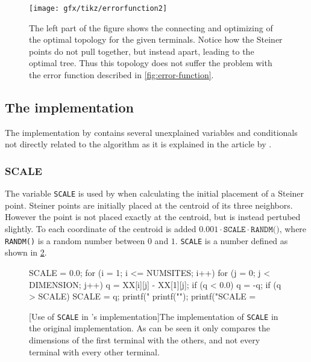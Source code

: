 \begin{figure}[htbp]
  \centering
  \texttt{[image: gfx/tikz/errorfunction2]}
  \caption[Possible problem with the error function]{The left part of the figure
    shows the connecting and optimizing of the optimal topology for the given
    terminals. Notice how the Steiner points do not pull together, but
    instead apart, leading to the optimal tree. Thus this topology does not
    suffer the problem with the error function described in
    \cref{fig:error-function}.\label{fig:error-function2}}
\end{figure}

\subsection{The implementation}
\label{sec:implementation}

The implementation by \citeauthor{smith1992} contains several unexplained variables and conditionals not
directly related to the algorithm as it is explained in the article by \textcite{smith1992}.

\subsubsection{SCALE}
\label{sec:scale}

The variable \texttt{SCALE} is used by \citeauthor{smith1992} when calculating the initial
placement of a Steiner point. Steiner points are initially placed at the
centroid of its three neighbors. However the point is not placed exactly at the
centroid, but is instead pertubed slightly. To each coordinate of the centroid
is added $0.001 \cdot \texttt{SCALE} \cdot \texttt{RANDM()}$, where \texttt{RANDM()} is a
random number between $0$ and $1$. \texttt{SCALE} is a number defined as shown
in \cref{fig:randm}.

\begin{figure}[htbp]
\begin{c-code}
SCALE = 0.0;
for (i = 1; i <= NUMSITES; i++) {
  for (j = 0; j < DIMENSION; j++) {
    q = XX[i][j] - XX[1][j];
    if (q < 0.0) q = -q;
    if (q > SCALE) SCALE = q;
    printf(" %
  }
  printf("\n");
}
printf("SCALE = %
\end{c-code}
  [Use of \texttt{SCALE} in \citeauthor{smith1992}'s implementation]{The implementation
    of \texttt{SCALE} in the original implementation. As can be seen it only
    compares the dimensions of the first terminal with the others, and not every
    terminal with every other terminal.\label{fig:randm}}
\end{figure}

